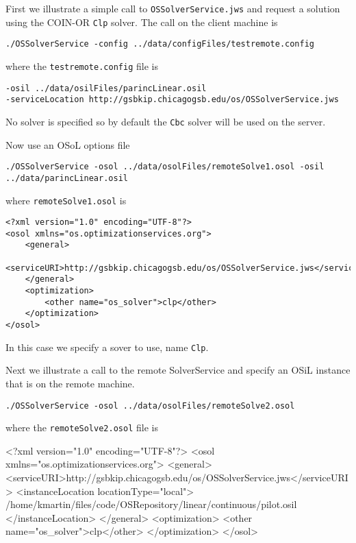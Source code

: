 \documentclass[11pt]{article}
\renewcommand{\_}{{\char"5F}}
\renewcommand{\{}{{\char"7B}}
\renewcommand{\}}{{\char"7D}}
\renewcommand{\^}{{\char"0D}}
\renewcommand{\'}{{\char"0D}}
\begin{document}
First we illustrate a simple call to   {\tt OSSolverService.jws} and request a solution using the COIN-OR  {\tt Clp} solver.  The call on the client machine is

\begin{verbatim}
./OSSolverService -config ../data/configFiles/testremote.config
\end{verbatim}
where the {\tt testremote.config} file is
\begin{verbatim}
-osil ../data/osilFiles/parincLinear.osil
-serviceLocation http://gsbkip.chicagogsb.edu/os/OSSolverService.jws
\end{verbatim}

No solver is specified so by default the  {\tt Cbc} solver will be used on the server.  

Now use an OSoL options file
\begin{verbatim}
./OSSolverService -osol ../data/osolFiles/remoteSolve1.osol -osil ../data/parincLinear.osil
\end{verbatim}
where {\tt remoteSolve1.osol} is
\begin{verbatim}
<?xml version="1.0" encoding="UTF-8"?>
<osol xmlns="os.optimizationservices.org">
    <general>
        <serviceURI>http://gsbkip.chicagogsb.edu/os/OSSolverService.jws</serviceURI>
    </general>
    <optimization>
    	<other name="os_solver">clp</other>
    </optimization>
</osol>
\end{verbatim}
In this case we specify a sover to use, name {\tt Clp}.

Next we illustrate a call to the remote SolverService and specify an OSiL instance that is on the remote machine.
\begin{verbatim}
./OSSolverService -osol ../data/osolFiles/remoteSolve2.osol
\end{verbatim}
where the {\tt remoteSolve2.osol} file is
\begin{verbatimtab}[4]
<?xml version="1.0" encoding="UTF-8"?>
<osol xmlns="os.optimizationservices.org">
    <general>
        <serviceURI>http://gsbkip.chicagogsb.edu/os/OSSolverService.jws</serviceURI>
         <instanceLocation locationType="local">
	 /home/kmartin/files/code/OSRepository/linear/continuous/pilot.osil
	 </instanceLocation>
    </general>
    <optimization>
    	<other name="os_solver">clp</other>
    </optimization>
</osol>
\end{verbatimtab}
\end{document}
